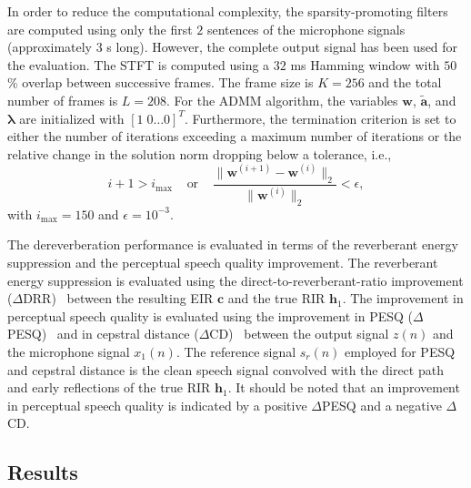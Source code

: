 \documentclass{article}
\begin{document}
In order to reduce the computational complexity, the sparsity-promoting filters are computed using only the first $2$ sentences of the microphone signals (approximately $3$ s long). However, the complete output signal has been used for the evaluation. The STFT is computed using a $32$ ms Hamming window with $50$\% overlap between successive frames. The frame size is $K = 256$ and the total number of frames is $L = 208$.
For the ADMM algorithm, the variables $\mathbf{w}$, $\tilde{\mathbf{a}}$, and $\boldsymbol{\lambda}$ are initialized with $[1 \; 0 \ldots 0]^T$.
Furthermore, the termination criterion is set to either the number of iterations exceeding a maximum number of iterations or the relative change in the solution norm dropping below a tolerance, i.e.,
\begin{equation}
i + 1 > i_{\max} \; \; \; \; {\text{or}} \; \; \; \; \frac{\|\mathbf{w}^{(i+1)}-\mathbf{w}^{(i)}\|_2}{\|\mathbf{w}^{(i)}\|_2} < \epsilon,
\end{equation}
with $i_{\max} = 150$ and $\epsilon = 10^{-3}$.

The dereverberation performance is evaluated in terms of the reverberant energy suppression and the perceptual speech quality improvement.
The reverberant energy suppression is evaluated using the direct-to-reverberant-ratio improvement ($\Delta$DRR)~\cite{Naylor_Derev_book} between the resulting EIR $\mathbf{c}$ and the true RIR $\mathbf{h}_1$.
The improvement in perceptual speech quality is evaluated using the improvement in PESQ ($\Delta$PESQ)~\cite{PESQ} and in cepstral distance ($\Delta$CD)~\cite{Quackenbush_book} between the output signal $z(n)$ and the microphone signal $x_1(n)$. 
The reference signal $s_r(n)$ employed for PESQ and cepstral distance is the clean speech signal convolved with the direct path and early reflections of the true RIR $\mathbf{h}_1$.
It should be noted that an improvement in perceptual speech quality is indicated by a positive $\Delta$PESQ and a negative $\Delta$CD.

\subsection{Results}
\end{document}
